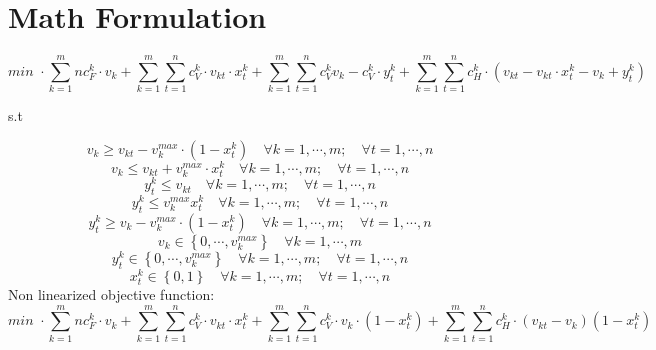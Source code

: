 \documentclass[a4paper,12pt,titlepage]{article}
\begin{document}
\newpage






\section*{Math Formulation}

\begin{equation}
min\,\,\cdot\sum_{k=1}^{m}nc_F^k\cdot v_k + 
\sum_{k=1}^{m}\sum_{t=1}^{n} c_V^k\cdot v_{kt}\cdot x_t^k +
\sum_{k=1}^{m}\sum_{t=1}^{n}c_V^k v_{k}-c_V^k\cdot y_t^k+ 
\sum_{k=1}^{m}\sum_{t=1}^{n}c_H^k \cdot(v_{kt} - v_{kt}\cdot x_t^k - v_k + y_t^k)
\tag{1}
\end{equation}
\begin{center}
	s.t
\end{center}
\begin{equation*}
v_k\geq v_{kt} - v_k^{max}\cdot(1-x_t^k)\quad\forall k=1,\cdots,m;\quad\forall t=1,\cdots,n
\tag{2}
\end{equation*}
\begin{equation*}
v_k\leq v_{kt} + v_k^{max}\cdot x_t^k\quad\forall k=1,\cdots,m;\quad\forall t=1,\cdots,n
\tag{3}
\end{equation*}
\begin{equation*}
y_t^k\leq v_{kt} \quad\forall k=1,\cdots,m;\quad\forall t=1,\cdots,n
\tag{4}
\end{equation*}
\begin{equation*}
y_t^k\leq v_k^{max}x_t^k \quad\forall k=1,\cdots,m;\quad\forall t=1,\cdots,n
\tag{5}
\end{equation*}
\begin{equation*}
y_t^k\geq v_k - v_k^{max}\cdot (1-x_t^k)\quad\forall k=1,\cdots,m;\quad\forall t=1,\cdots,n
\tag{6}
\end{equation*}
\begin{equation*}
v_k\in\left\lbrace 0,\cdots,v_k^{max}\right\rbrace\quad\forall k=1,\cdots,m
\tag{7}
\end{equation*}
\begin{equation*}
y_t^k\in\left\lbrace 0,\cdots,v_k^{max}\right\rbrace\quad\forall k=1,\cdots,m;\quad\forall t=1,\cdots,n
\tag{8}
\end{equation*}
\begin{equation*}
x_t^k\in\left\lbrace 0,1\right\rbrace\quad\forall k=1,\cdots,m;\quad\forall t=1,\cdots,n
\tag{9}
\end{equation*}
Non linearized objective function:\\
\begin{equation*}
min\,\,\cdot\sum_{k=1}^{m}nc_F^k\cdot v_k + 
\sum_{k=1}^{m}\sum_{t=1}^{n} c_V^k\cdot v_{kt}\cdot x_t^k +
\sum_{k=1}^{m}\sum_{t=1}^{n}c_V^k\cdot v_{k}\cdot (1-x_t^k)+  \sum_{k=1}^{m}\sum_{t=1}^{n}c_H^k\cdot(v_{kt}-v_k)(1-x_t^k)
\end{equation*}
\end{document}
